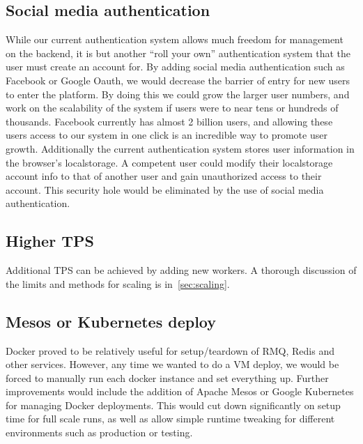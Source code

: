 \subsection{Social media authentication}
While our current authentication system allows much freedom for management on the backend, it is but another “roll your own” authentication system that the user must create an account for.
By adding social media authentication such as Facebook or Google Oauth, we would decrease the barrier of entry for new users to enter the platform.
By doing this we could grow the larger user numbers, and work on the scalability of the system if users were to near tens or hundreds of thousands.
Facebook currently has almost 2 billion users, and allowing these users access to our system in one click is an incredible way to promote user growth.
Additionally the current authentication system stores user information in the browser’s localstorage.
A competent user could modify their localstorage account info to that of another user and gain unauthorized access to their account.
This security hole would be eliminated by the use of social media authentication.

\subsection{Higher TPS}
Additional TPS can be achieved by adding new workers.
A thorough discussion of the limits and methods for scaling is in~\ref{sec:scaling}.

\subsection{Mesos or Kubernetes deploy}
Docker proved to be relatively useful for setup/teardown of RMQ, Redis and other services.
However, any time we wanted to do a VM deploy, we would be forced to manually run each docker instance and set everything up.
Further improvements would include the addition of Apache Mesos or Google Kubernetes for managing Docker deployments.
This would cut down significantly on setup time for full scale runs, as well as allow simple runtime tweaking for different environments such as production or testing.
